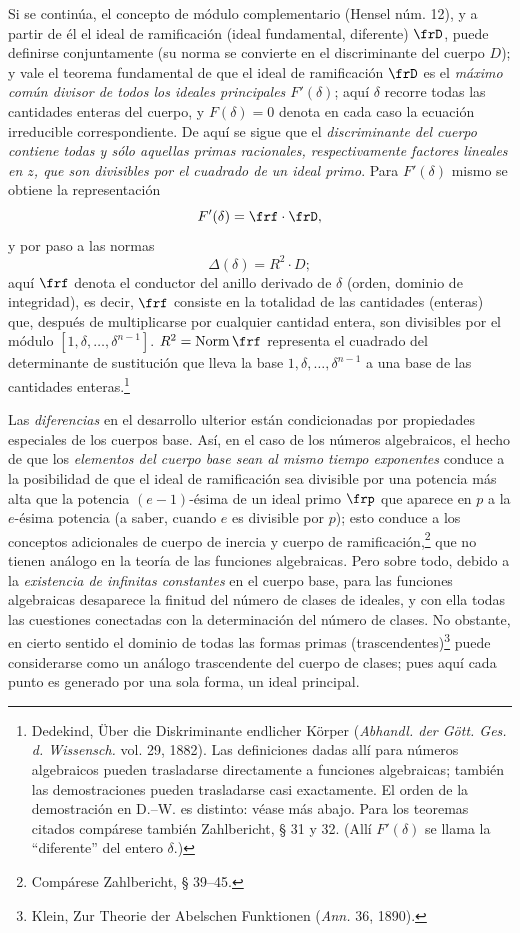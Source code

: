 \documentclass[11pt]{article}
\begin{document}
Si se continúa, el concepto de módulo complementario (Hensel núm. 12), y a partir de él el ideal de ramificación (ideal fundamental, diferente) \(\frD\), puede definirse conjuntamente (su norma se convierte en el discriminante del cuerpo \(D\)); y vale el teorema fundamental de que el ideal de ramificación \(\frD\) es el \emph{máximo común divisor de todos los ideales principales \(F'(\delta)\)}; aquí \(\delta\) recorre todas las cantidades enteras del cuerpo, y \(F(\delta)=0\) denota en cada caso la ecuación irreducible correspondiente. De aquí se sigue que el \emph{discriminante del cuerpo contiene todas y sólo aquellas primas racionales, respectivamente factores lineales en \(z\), que son divisibles por el cuadrado de un ideal primo}. Para \(F'(\delta)\) mismo se obtiene la representación
\[
F'(\delta)=\frf\cdot\frD,
\]
y por paso a las normas
\[
\Delta(\delta)=R^2\cdot D;
\]
aquí \(\frf\) denota el conductor del anillo derivado de \(\delta\) (orden, dominio de integridad), es decir, \(\frf\) consiste en la totalidad de las cantidades (enteras) que, después de multiplicarse por cualquier cantidad entera, son divisibles por el módulo \([1,\delta,\ldots,\delta^{n-1}]\). \(R^2=\operatorname{Norm}\frf\) representa el cuadrado del determinante de sustitución que lleva la base \(1,\delta,\ldots,\delta^{n-1}\) a una base de las cantidades enteras.\footnote{Dedekind, Über die Diskriminante endlicher Körper (\emph{Abhandl. der Gött. Ges. d. Wissensch.} vol. 29, 1882). Las definiciones dadas allí para números algebraicos pueden trasladarse directamente a funciones algebraicas; también las demostraciones pueden trasladarse casi exactamente. El orden de la demostración en D.--W. es distinto: véase más abajo. Para los teoremas citados compárese también Zahlbericht, § 31 y 32. (Allí \(F'(\delta)\) se llama la ``diferente'' del entero \(\delta\).)}

Las \emph{diferencias} en el desarrollo ulterior están condicionadas por propiedades especiales de los cuerpos base. Así, en el caso de los números algebraicos, el hecho de que los \emph{elementos del cuerpo base sean al mismo tiempo exponentes} conduce a la posibilidad de que el ideal de ramificación sea divisible por una potencia más alta que la potencia \((e-1)\)-ésima de un ideal primo \(\frp\) que aparece en \(p\) a la \(e\)-ésima potencia (a saber, cuando \(e\) es divisible por \(p\)); esto conduce a los conceptos adicionales de cuerpo de inercia y cuerpo de ramificación,\footnote{Compárese Zahlbericht, § 39--45.} que no tienen análogo en la teoría de las funciones algebraicas. Pero sobre todo, debido a la \emph{existencia de infinitas constantes} en el cuerpo base, para las funciones algebraicas desaparece la finitud del número de clases de ideales, y con ella todas las cuestiones conectadas con la determinación del número de clases. No obstante, en cierto sentido el dominio de todas las formas primas (trascendentes)\footnote{Klein, Zur Theorie der Abelschen Funktionen (\emph{Ann.} 36, 1890).} puede considerarse como un análogo trascendente del cuerpo de clases; pues aquí cada punto es generado por una sola forma, un ideal principal.
\end{document}
